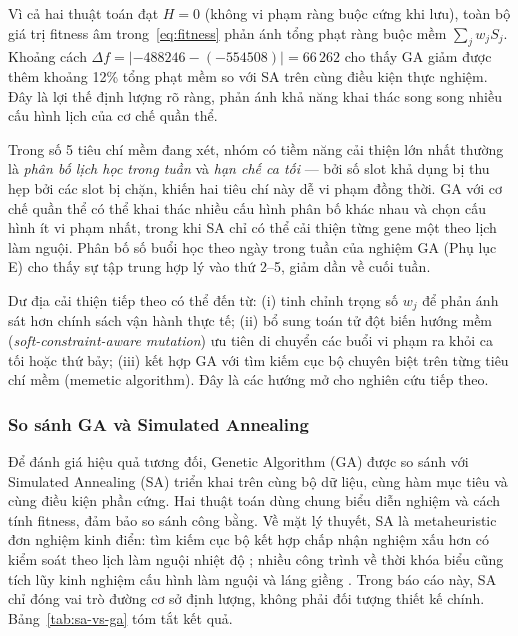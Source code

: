 \documentclass[a4paper,12pt,oneside]{article}
\begin{document}
	Vì cả hai thuật toán đạt $H = 0$ (không vi phạm ràng buộc cứng khi lưu), toàn bộ giá trị fitness âm trong~\eqref{eq:fitness} phản ánh tổng phạt ràng buộc mềm $\sum_{j} w_j S_j$. Khoảng cách $\Delta f = |-488246 - (-554508)| = 66\,262$ cho thấy GA giảm được thêm khoảng 12\% tổng phạt mềm so với SA trên cùng điều kiện thực nghiệm. Đây là lợi thế định lượng rõ ràng, phản ánh khả năng khai thác song song nhiều cấu hình lịch của cơ chế quần thể.

	Trong số 5 tiêu chí mềm đang xét, nhóm có tiềm năng cải thiện lớn nhất thường là \textit{phân bố lịch học trong tuần} và \textit{hạn chế ca tối} --- bởi số slot khả dụng bị thu hẹp bởi các slot bị chặn, khiến hai tiêu chí này dễ vi phạm đồng thời. GA với cơ chế quần thể có thể khai thác nhiều cấu hình phân bố khác nhau và chọn cấu hình ít vi phạm nhất, trong khi SA chỉ có thể cải thiện từng gene một theo lịch làm nguội. Phân bố số buổi học theo ngày trong tuần của nghiệm GA (Phụ lục E) cho thấy sự tập trung hợp lý vào thứ 2--5, giảm dần về cuối tuần.

	Dư địa cải thiện tiếp theo có thể đến từ: (i) tinh chỉnh trọng số $w_j$ để phản ánh sát hơn chính sách vận hành thực tế; (ii) bổ sung toán tử đột biến hướng mềm (\textit{soft-constraint-aware mutation}) ưu tiên di chuyển các buổi vi phạm ra khỏi ca tối hoặc thứ bảy; (iii) kết hợp GA với tìm kiếm cục bộ chuyên biệt trên từng tiêu chí mềm (memetic algorithm). Đây là các hướng mở cho nghiên cứu tiếp theo.
	
	\subsubsection{So sánh GA và Simulated Annealing}
	\label{subsec:doi-sanh-ga-sa}
	
	Để đánh giá hiệu quả tương đối, Genetic Algorithm (GA) được so sánh với Simulated Annealing (SA) triển khai trên cùng bộ dữ liệu, cùng hàm mục tiêu và cùng điều kiện phần cứng. Hai thuật toán dùng chung biểu diễn nghiệm và cách tính fitness, đảm bảo so sánh công bằng. Về mặt lý thuyết, SA là metaheuristic đơn nghiệm kinh điển: tìm kiếm cục bộ kết hợp chấp nhận nghiệm xấu hơn có kiểm soát theo lịch làm nguội nhiệt độ \cite{kirkpatrick1983optimization,vanlaarhoven1987simulated}; nhiều công trình về thời khóa biểu cũng tích lũy kinh nghiệm cấu hình làm nguội và láng giềng \cite{thompson1996general,thompson1998robust}. Trong báo cáo này, SA chỉ đóng vai trò đường cơ sở định lượng, không phải đối tượng thiết kế chính. Bảng~\ref{tab:sa-vs-ga} tóm tắt kết quả.
	
\end{document}
